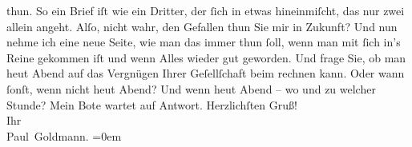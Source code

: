                thun. So ein Brief iſt wie ein Dritter, der ſich in etwas hineinmiſcht, das nur zwei
               allein angeht. Alſo, nicht wahr, den Gefallen thun Sie mir  in Zukunft?{\dotsfour}\pend
           \pstart
           {\pb}Und nun nehme ich eine neue Seite,
                   wie man das immer thun ſoll, wenn man mit ſich
               in’s Reine gekommen iſt und wenn Alles wieder gut geworden. Und frage Sie, ob man
                  heut{ }Abend auf das Vergnügen Ihrer Geſellſchaft beim \label{K_L02645-2v}\label{K_L02645-2h}
                  rechnen\strikeout{\textcolor{gray}{×}} kann. Oder wann ſonſt, wenn nicht heut{ }Abend? Und wenn heut{ }Abend – wo und zu welcher Stunde?\pend
           \pstart
           Mein Bote wartet auf Antwort.\pend
           \pstart
           Herzlichſten Gruß! {\\[\baselineskip]}Ihr {\\[\baselineskip]}\spacefill\mbox{Paul Goldmann.}\pend
           \leftskip=0em{}\endnumbering{}  
      